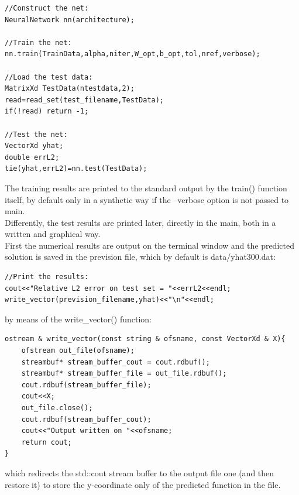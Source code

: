 \documentclass[12pt, a4paper]{report}
\theoremstyle{definition}
\begin{document}
\begin{lstlisting}[frame=single]
//Construct the net:
NeuralNetwork nn(architecture);

//Train the net:
nn.train(TrainData,alpha,niter,W_opt,b_opt,tol,nref,verbose);

//Load the test data:
MatrixXd TestData(ntestdata,2);
read=read_set(test_filename,TestData);
if(!read) return -1;

//Test the net:
VectorXd yhat;
double errL2;
tie(yhat,errL2)=nn.test(TestData);
\end{lstlisting}
The training results are printed to the standard output by the {\ttfamily train()} function itself, by default only in a synthetic way if the {\ttfamily --verbose} option is not passed to main. \\
Differently, the test results are printed later, directly in the main, both in a written and graphical way. \\
First the numerical results are output on the terminal window and the predicted solution is saved in the prevision file, which by default is data/yhat300.dat:
\begin{lstlisting}[frame=single, showstringspaces=false]
//Print the results:
cout<<"Relative L2 error on test set = "<<errL2<<endl;
write_vector(prevision_filename,yhat)<<"\n"<<endl;
\end{lstlisting}
by means of the {\ttfamily write\_vector()} function:
\begin{lstlisting}[frame=single, showstringspaces=false]
ostream & write_vector(const string & ofsname, const VectorXd & X){
	ofstream out_file(ofsname);
	streambuf* stream_buffer_cout = cout.rdbuf();
	streambuf* stream_buffer_file = out_file.rdbuf();
	cout.rdbuf(stream_buffer_file);
	cout<<X;
	out_file.close();
	cout.rdbuf(stream_buffer_cout);
	cout<<"Output written on "<<ofsname;
	return cout;
} 
\end{lstlisting}
which redirects the {\ttfamily std::cout} stream buffer to the output file one (and then restore it) to store the y-coordinate only of the predicted function in the file.\\ 
\end{document}
